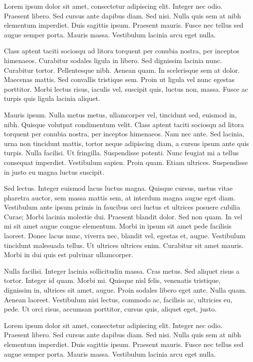 Lorem ipsum dolor sit amet, consectetur adipiscing elit. Integer nec
odio. Praesent libero. Sed cursus ante dapibus diam. Sed nisi. Nulla
quis sem at nibh elementum imperdiet. Duis sagittis ipsum. Praesent
mauris. Fusce nec tellus sed augue semper porta. Mauris massa.
Vestibulum lacinia arcu eget nulla.

Class aptent taciti sociosqu ad litora torquent per conubia nostra, per
inceptos himenaeos. Curabitur sodales ligula in libero. Sed dignissim
lacinia nunc. Curabitur tortor. Pellentesque nibh. Aenean quam. In
scelerisque sem at dolor. Maecenas mattis. Sed convallis tristique sem.
Proin ut ligula vel nunc egestas porttitor. Morbi lectus risus, iaculis
vel, suscipit quis, luctus non, massa. Fusce ac turpis quis ligula
lacinia aliquet.

Mauris ipsum. Nulla metus metus, ullamcorper vel, tincidunt sed, euismod
in, nibh. Quisque volutpat condimentum velit. Class aptent taciti
sociosqu ad litora torquent per conubia nostra, per inceptos himenaeos.
Nam nec ante. Sed lacinia, urna non tincidunt mattis, tortor neque
adipiscing diam, a cursus ipsum ante quis turpis. Nulla facilisi. Ut
fringilla. Suspendisse potenti. Nunc feugiat mi a tellus consequat
imperdiet. Vestibulum sapien. Proin quam. Etiam ultrices. Suspendisse in
justo eu magna luctus suscipit.

Sed lectus. Integer euismod lacus luctus magna. Quisque cursus, metus
vitae pharetra auctor, sem massa mattis sem, at interdum magna augue
eget diam. Vestibulum ante ipsum primis in faucibus orci luctus et
ultrices posuere cubilia Curae; Morbi lacinia molestie dui. Praesent
blandit dolor. Sed non quam. In vel mi sit amet augue congue elementum.
Morbi in ipsum sit amet pede facilisis laoreet. Donec lacus nunc,
viverra nec, blandit vel, egestas et, augue. Vestibulum tincidunt
malesuada tellus. Ut ultrices ultrices enim. Curabitur sit amet mauris.
Morbi in dui quis est pulvinar ullamcorper.

Nulla facilisi. Integer lacinia sollicitudin massa. Cras metus. Sed
aliquet risus a tortor. Integer id quam. Morbi mi. Quisque nisl felis,
venenatis tristique, dignissim in, ultrices sit amet, augue. Proin
sodales libero eget ante. Nulla quam. Aenean laoreet. Vestibulum nisi
lectus, commodo ac, facilisis ac, ultricies eu, pede. Ut orci risus,
accumsan porttitor, cursus quis, aliquet eget, justo.

Lorem ipsum dolor sit amet, consectetur adipiscing elit. Integer nec
odio. Praesent libero. Sed cursus ante dapibus diam. Sed nisi. Nulla
quis sem at nibh elementum imperdiet. Duis sagittis ipsum. Praesent
mauris. Fusce nec tellus sed augue semper porta. Mauris massa.
Vestibulum lacinia arcu eget nulla.

